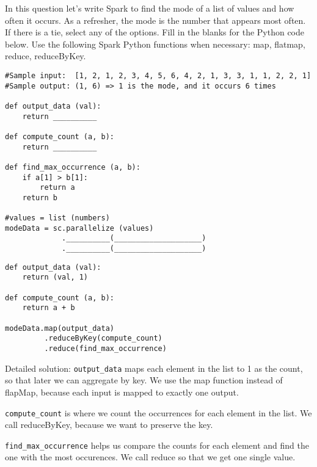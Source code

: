 \begin{blocksection}
\question
In this question let’s write Spark to find the mode of a list of values and how often it occurs. As a refresher, the mode is the number that appears most often. If there is a tie, select any of the options. Fill in the blanks for the Python code below.​ Use the following Spark Python functions when necessary: map​, flatmap​, reduce​, reduceByKey​. 

\begin{verbatim}
#Sample input:  [1​, 2, 1​, 2, 3, 4, 5, 6, 4, 2, 1,​ 3, 3, 1​, 1​, 2, 2, 1​]
#Sample output: (1, 6) => 1 is the mode, and it occurs 6 times

def output_data (val):
    return __________

def compute_count (a, b):
    return __________

def find_max_occurrence (a, b):
    if a[1] > b[1]: 
        return a 
    return b

#values = list (numbers) 
modeData = sc.parallelize (values)
			 .__________(____________________)
			 .__________(____________________)
\end{verbatim}

\begin{solution}
\begin{verbatim}
def output_data (val):
    return (val, 1)

def compute_count (a, b):
    return a + b

modeData.map(output_data)
         .reduceByKey(compute_count)
         .reduce(find_max_occurrence)
\end{verbatim}
 
Detailed solution:
\lstinline$output_data$ maps each element in the list to 1 as the count, so that later we can aggregate by key. We use the map function instead of flapMap, because each input is mapped to exactly one output.

\lstinline$compute_count$ is where we count the occurrences for each element in the list. We call reduceByKey, because we want to preserve the key.

\lstinline$find_max_occurrence$ helps us compare the counts for each element and find the one with the most occurences. We call reduce so that we get one single value.
\end{solution}

\end{blocksection}
